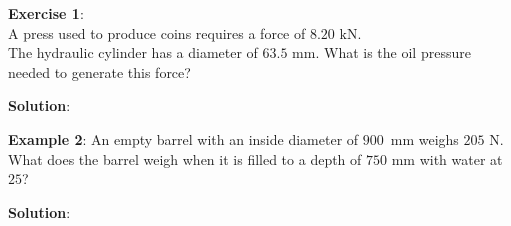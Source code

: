 \documentclass[10pt]{amsart}
\begin{document}
\begin{minipage}[t]{0.45\textwidth}
 \raggedright
 \textbf{Exercise 1}:\\
 A press used to produce coins requires a force of $8.20\text{ kN}$.\\
 The hydraulic cylinder has
 a diameter of $63.5\text{ mm}$. \parb
 What is the oil pressure needed to generate this force?
 \par\vspace{3.25cm}
\end{minipage}
\hfill
\begin{minipage}[t]{0.5\textwidth}
 \textbf{Solution}:
\end{minipage}
\vfill
\newpage
\begin{minipage}[t]{0.4\textwidth}
 \raggedright
 \textbf{Example 2}:\parb
 An empty barrel with an inside diameter of $900$~mm weighs $205$ N. \parb
 What does the barrel weigh when it is filled to a depth of $750$ mm
 with water at $25$\textcelsius{}?
 \par\vspace{9cm}
\end{minipage}
\hfill
\begin{minipage}[t]{0.55\textwidth}
 
 \textbf{Solution}:
 \parb
\end{minipage}
\end{document}
